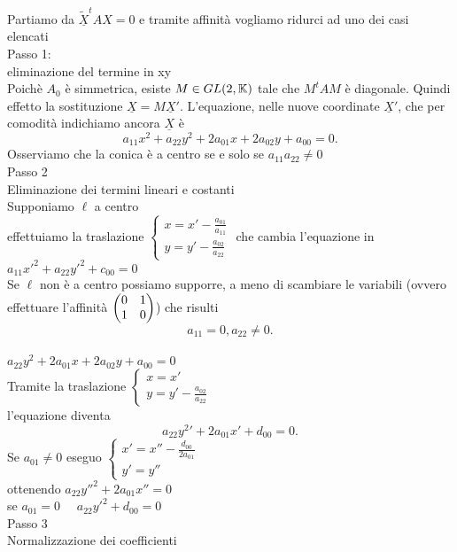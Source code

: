 \documentclass[12px]{article}
\begin{document}
	\begin{dimo}
		Partiamo da $\underline{\widetilde{X}}^t A X = 0$ e tramite affinità vogliamo ridurci ad uno dei casi elencati\\
		Passo 1:\\
		eliminazione del termine in xy \\ 
		Poichè $A_0$ è simmetrica, esiste $M\in GL(2,\mathbb{K})$ tale che $M^t AM$ è diagonale. Quindi effetto la sostituzione $\underline X = M\underline X '$. L'equazione, nelle nuove coordinate $\underline X'$, che per comodità indichiamo ancora $\underline X$ è 
		\[
		a_{11}x^2 + a_{22}y^2 + 2a_{01}x + 2a_{02}y + a_00 = 0
		.\] 
		Osserviamo che la conica è a centro se e solo se $a_{11}a_{22}\neq 0$\\
		Passo 2\\
		Eliminazione dei termini lineari e costanti\\
		Supponiamo $\ell$ a centro \\
		effettuiamo la traslazione $\begin{cases}
			x = x' - \frac {a_{01}}{a_{11}}\\
			y = y' - \frac{a_{02}}{a_{22}}
		\end{cases}$
		che cambia l'equazione in 
		$a_11 x'^2 + a_{22}y'^2 + c_00 = 0$\\
		Se $\ell$ non è a centro possiamo supporre, a meno di scambiare le variabili (ovvero effettuare l'affinità $\begin{pmatrix}0&1\\1&0\end{pmatrix}$) che risulti\\
		 \[
		a_11 =0, a_{22}\neq 0
		.\] \\
		$a_{22}y^2 + 2a_{01}x + 2a_{02}y + a_{00} =0 $\\
		Tramite la traslazione $ \begin{cases}
			x = x'\\
			y = y'-\frac {a_{02}}{a_{22}}
		\end{cases}$ \\
		l'equazione diventa
		\[
		a_22y^2' + 2a_{01}x' + d_{00}=0
		.\] 
		Se $a_{01}\neq 0$ eseguo $ \begin{cases}
			x' = x'' - \frac {d_{00}}{2a_{01}}\\
			y' = y''
		\end{cases}$\\
		ottenendo $a_{22} y''^2 + 2 a_{01}x''=0$\\
		se $a_{01} = 0$ \  \ $a_{22} y'^2 + d_{00}=0$\\
		Passo 3\\
		Normalizzazione dei coefficienti \\

\end{dimo}
\end{document}
